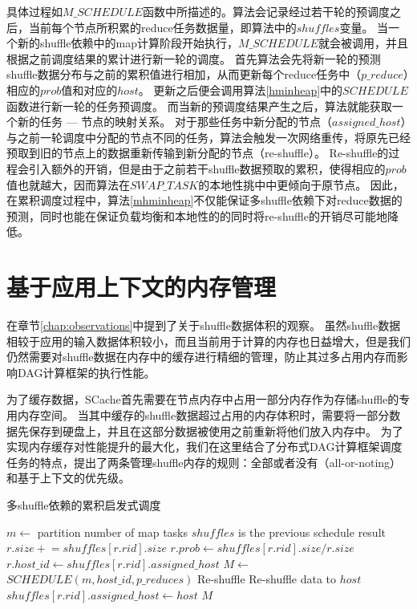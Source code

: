 具体过程如$M\_SCHEDULE$函数中所描述的。算法会记录经过若干轮的预调度之后，当前每个节点所积累的reduce任务数据量，即算法中的$shuffles$变量。
当一个新的shuffle依赖中的map计算阶段开始执行，$M\_SCHEDULE$就会被调用，并且根据之前调度结果的累计进行新一轮的调度。
首先算法会先将新一轮的预测shuffle数据分布与之前的累积值进行相加，从而更新每个reduce任务中（$p\_reduce$）相应的$prob$值和对应的$host$。
更新之后便会调用算法\ref{hminheap}中的$SCHEDULE$函数进行新一轮的任务预调度。
而当新的预调度结果产生之后，算法就能获取一个新的任务 --- 节点的映射关系。
对于那些任务中新分配的节点（$assigned\_host$）与之前一轮调度中分配的节点不同的任务，算法会触发一次网络重传，将原先已经预取到旧的节点上的数据重新传输到新分配的节点（re-shuffle）。
Re-shuffle的过程会引入额外的开销，但是由于之前若干shuffle数据预取的累积，使得相应的$prob$值也就越大，因而算法在$SWAP\_TASK$的本地性挑中中更倾向于原节点。
因此，在累积调度过程中，算法\ref{mhminheap}不仅能保证多shuffle依赖下对reduce数据的预测，同时也能在保证负载均衡和本地性的的同时将re-shuffle的开销尽可能地降低。

\section{基于应用上下文的内存管理}

在章节\ref{chap:observations}中提到了关于shuffle数据体积的观察。
虽然shuffle数据相较于应用的输入数据体积较小，而且当前用于计算的内存也日益增大，但是我们仍然需要对shuffle数据在内存中的缓存进行精细的管理，防止其过多占用内存而影响DAG计算框架的执行性能。

为了缓存数据，SCache首先需要在节点内存中占用一部分内存作为存储shuffle的专用内存空间。
当其中缓存的shuffle数据超过占用的内存体积时，需要将一部分数据先保存到硬盘上，并且在这部分数据被使用之前重新将他们放入内存中。
为了实现内存缓存对性能提升的最大化，我们在这里结合了分布式DAG计算框架调度任务的特点，提出了两条管理shuffle内存的规则：全部或者没有（all-or-noting）和基于上下文的优先级。

\begin{algorithm}[H]
	\caption{多shuffle依赖的累积启发式调度}
	\label{mhminheap}
	\begin{algorithmic}[1]
		\small
			\State $m\gets$ partition number of map tasks
			\Comment $shuffles$ is the previous schedule result
				\State $r.size \mathrel{+}= shuffles\left[r.rid\right].size$
					\State $r.prob\gets shuffles\left[r.rid\right].size / r.size$
					\State $r.host\_id\gets shuffles\left[r.rid\right].assigned\_host$
				\EndIf
			\EndFor
			\State $M\gets$ $SCHEDULE\left(m, host\_id, p\_reduces\right)$
				\Comment Re-shuffle
					\State Re-shuffle data to $host$
					\State $shuffles\left[r.rid\right].assigned\_host\gets host$
					\EndIf
				\EndFor
			\EndFor
			\Return $M$
		\EndProcedure
	\end{algorithmic}
\end{algorithm}

